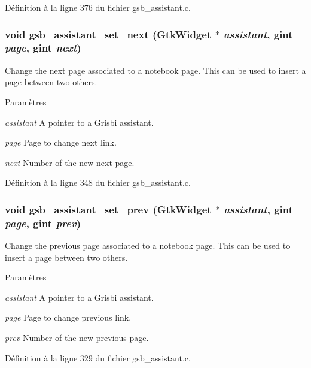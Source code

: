 Définition à la ligne 376 du fichier gsb\_\-assistant.c.

\subsubsection[{gsb\_\-assistant\_\-set\_\-next}]{\setlength{\rightskip}{0pt plus 5cm}void gsb\_\-assistant\_\-set\_\-next (GtkWidget $\ast$ {\em assistant}, \/  gint {\em page}, \/  gint {\em next})}\label{gsb__assistant_8h_a06ff0b5745a3a4bd14ceecbd56cd09c1}
Change the next page associated to a notebook page. This can be used to insert a page between two others.


\begin{DoxyParams}{Paramètres}
\item[{\em assistant}]A pointer to a Grisbi assistant. \item[{\em page}]Page to change next link. \item[{\em next}]Number of the new next page. \end{DoxyParams}


Définition à la ligne 348 du fichier gsb\_\-assistant.c.

\subsubsection[{gsb\_\-assistant\_\-set\_\-prev}]{\setlength{\rightskip}{0pt plus 5cm}void gsb\_\-assistant\_\-set\_\-prev (GtkWidget $\ast$ {\em assistant}, \/  gint {\em page}, \/  gint {\em prev})}\label{gsb__assistant_8h_a9c400b973258731e6d4dd4a01a63e1aa}
Change the previous page associated to a notebook page. This can be used to insert a page between two others.


\begin{DoxyParams}{Paramètres}
\item[{\em assistant}]A pointer to a Grisbi assistant. \item[{\em page}]Page to change previous link. \item[{\em prev}]Number of the new previous page. \end{DoxyParams}


Définition à la ligne 329 du fichier gsb\_\-assistant.c.

